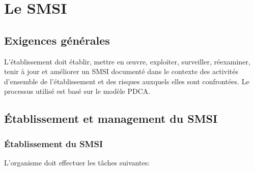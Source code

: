 \section{Le SMSI}

\subsection{Exigences générales}

L'établissement doit établir, mettre en \oe{}uvre, exploiter, surveiller, réexaminer, tenir à jour et améliorer un SMSI documenté dans le contexte des activités d'ensemble de l'établissement et des risques auxquels elles sont confrontées. Le processus utilisé est basé sur le modèle PDCA.

\subsection{\'Etablissement et management du SMSI}

\subsubsection{\'Etablissement du SMSI}

L'organisme doit effectuer les tâches suivantes:

